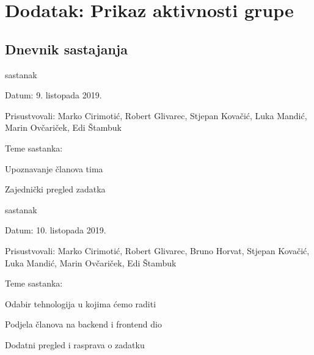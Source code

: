 \chapter*{Dodatak: Prikaz aktivnosti grupe}
		
		\section*{Dnevnik sastajanja}
		
		
		\begin{packed_enum}
			\item  sastanak
			
			\item[] \begin{packed_item}
				\item Datum: 9. listopada 2019.
				\item Prisustvovali: Marko Cirimotić, Robert Glivarec, Stjepan Kovačić, Luka Mandić, Marin Ovčariček, Edi Štambuk
				\item Teme sastanka:
				\begin{packed_item}
					\item Upoznavanje članova tima
					\item Zajednički pregled zadatka
				\end{packed_item}
			\end{packed_item}
			
			\item  sastanak
			\item[] \begin{packed_item}
				\item Datum: 10. listopada 2019.
				\item Prisustvovali: Marko Cirimotić, Robert Glivarec, Bruno Horvat, Stjepan Kovačić, Luka Mandić, Marin Ovčariček, Edi Štambuk
				\item Teme sastanka:
				\begin{packed_item}
					\item Odabir tehnologija u kojima ćemo raditi 
					\item Podjela članova na backend i frontend dio
					\item Dodatni pregled i rasprava o zadatku
				\end{packed_item}
			\end{packed_item}
		

\end{packed_enum}
